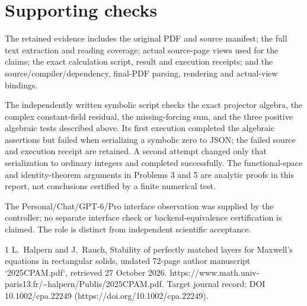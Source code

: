 \documentclass[10pt]{article}
\begin{document}
\section*{Supporting checks}
The retained evidence includes the original PDF and source manifest; the full text extraction and reading coverage; actual source-page views used for the claims; the exact calculation script, result and execution receipts; and the source/compiler/dependency, final-PDF parsing, rendering and actual-view bindings.\par
The independently written symbolic script checks the exact projector algebra, the complex constant-field residual, the missing-forcing sum, and the three positive algebraic tests described above. Its first execution completed the algebraic assertions but failed when serializing a symbolic zero to JSON; the failed source and execution receipt are retained. A second attempt changed only that serialization to ordinary integers and completed successfully. The functional-space and identity-theorem arguments in Problems 3 and 5 are analytic proofs in this report, not conclusions certified by a finite numerical test.\par
The Personal/Chat/GPT-6/Pro interface observation was supplied by the controller; no separate interface check or backend-equivalence certification is claimed. The role is distinct from independent scientific acceptance.\par
1 L. Halpern and J. Rauch, Stability of perfectly matched layers for Maxwell’s equations in rectangular solids, undated 72-page author manuscript `2025CPAM.pdf`, retrieved 27 October 2026. https://www.math.univ-paris13.fr/\textasciitilde{}halpern/Publis/2025CPAM.pdf. Target journal record: DOI 10.1002/cpa.22249 (https://doi.org/10.1002/cpa.22249).\par
\end{document}
